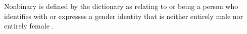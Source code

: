 Nonbinary is defined by the dictionary as relating to or being a person who 
identifies with or expresses a gender identity that is neither entirely male 
nor entirely female \cite{nonbinary-def}.

